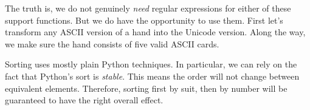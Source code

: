 \newpage

The truth is, we do not genuinely \emph{need} regular expressions for
either of these support functions. But we do have the opportunity to use
them. First let's transform any ASCII version of a hand into the Unicode
version. Along the way, we make sure the hand consists of five valid
ASCII cards.

\begin{Shaded}
\begin{Highlighting}[]
    \VerbatimStringTok{$\textquotesingle{}}
\OperatorTok{=}\NormalTok{ \{}\NormalTok{: }\StringTok{\textquotesingle{}}\StringTok{\textquotesingle{}}\NormalTok{, }\NormalTok{: }\StringTok{\textquotesingle{}}\StringTok{\textquotesingle{}}\NormalTok{,}
               \NormalTok{: }\StringTok{\textquotesingle{}}\StringTok{\textquotesingle{}}\NormalTok{, }\NormalTok{: }\StringTok{\textquotesingle{}}\StringTok{\textquotesingle{}}\NormalTok{\}}
\OperatorTok{=}
\end{Highlighting}
\end{Shaded}

Sorting uses mostly plain Python techniques. In particular, we can rely
on the fact that Python's sort is \emph{stable}. This means the order
will not change between equivalent elements. Therefore, sorting first by
suit, then by number will be guaranteed to have the right overall
effect.

